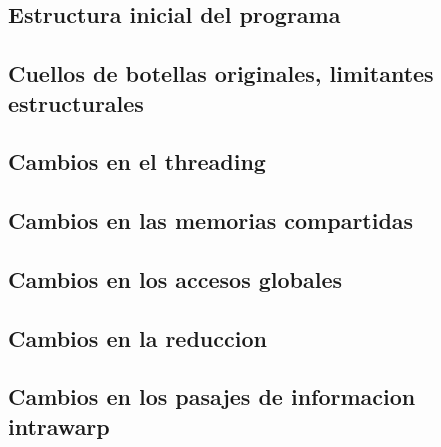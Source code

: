 
\subsection{Estructura inicial del programa}
\subsection{Cuellos de botellas originales, limitantes estructurales}
\subsection{Cambios en el threading}
\subsection{Cambios en las memorias compartidas}
\subsection{Cambios en los accesos globales}
\subsection{Cambios en la reduccion}
\subsection{Cambios en los pasajes de informacion intrawarp}

